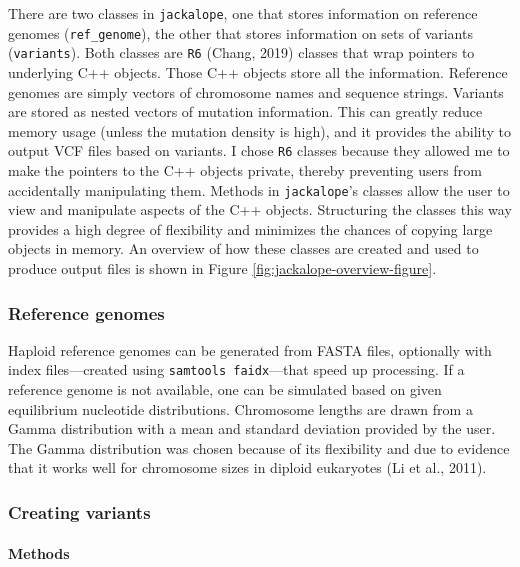 \documentclass[12pt,]{article}
\let\oldparagraph\paragraph
\renewcommand{\paragraph}[1]{\oldparagraph{#1}\mbox{}}
\begin{document}
There are two classes in \texttt{jackalope}, one that stores information on reference genomes
(\texttt{ref\_genome}), the other that stores information on sets of variants (\texttt{variants}).
Both classes are \texttt{R6} (Chang, 2019) classes that wrap pointers to underlying C++ objects.
Those C++ objects store all the information.
Reference genomes are simply vectors of chromosome names and sequence strings.
Variants are stored as nested vectors of mutation information.
This can greatly reduce memory usage (unless the mutation density is high), and
it provides the ability to output VCF files based on variants.
I chose \texttt{R6} classes because they allowed me to make the pointers to the C++ objects
private, thereby preventing users from accidentally manipulating them.
Methods in \texttt{jackalope}'s classes allow the user to view and manipulate aspects of the
C++ objects.
Structuring the classes this way provides a high degree of flexibility and
minimizes the chances of copying large objects in memory.
An overview of how these classes are created and used to produce output files is shown
in Figure \ref{fig:jackalope-overview-figure}.

\hypertarget{reference-genomes}{%
\subsubsection{Reference genomes}\label{reference-genomes}}

Haploid reference genomes can be generated from FASTA files, optionally with index
files---created using \texttt{samtools\ faidx}---that speed up processing.
If a reference genome is not available, one can be
simulated based on given equilibrium nucleotide distributions.
Chromosome lengths are drawn from a Gamma distribution
with a mean and standard deviation provided by the user.
The Gamma distribution was chosen because of its flexibility and due to evidence
that it works well for chromosome sizes in diploid eukaryotes (Li et al., 2011).

\hypertarget{creating-variants}{%
\subsubsection{Creating variants}\label{creating-variants}}

\hypertarget{methods}{%
\paragraph{Methods}\label{methods}}
\end{document}
